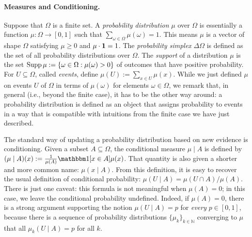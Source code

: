 \paragraph{Measures and Conditioning.}
Suppose that $\Omega$ is a finite set. 
A \emph{probability distribution} $\mu$ over $\Omega$ is essentially a function 
$\mu : \Omega \to [0,1]$ such that $\sum_{\omega \in \Omega} \mu(\omega) = 1$.
This means $\mu$ is a vector of shape 
$\Omega$ 
satisfying $\mu \ge 0$ and $\mu \cdot \mathbf 1 = 1$. 
The \emph{probability simplex} $\Delta \Omega$ is defined as the set of all probability distributions over $\Omega$. 
The \emph{support} of a distribution $\mu$
    is the set $\operatorname{\mathrm{Supp}} \mu := \{ \omega \in \Omega : \mu(\omega) > 0 \}$
    of outcomes that have positive probability.
For $U \subseteq \Omega$, called \emph{events},
    define $\mu(U) := \sum_{x \in U} \mu(x)$. 
While we just defined $\mu$ on events $U$ of $\Omega$ in terms of $\mu(\omega)$ for elements $\omega \in \Omega$, we remark that, in general (i.e., beyond the finite case), it has to be the other way around: 
a probability distribution is defined as an object that assigns probability to events in a way that is compatible with intuitions from the finite case we have just described.


The standard way of updating a probability distribution based on new evidence is conditioning.
Given a subset $A \subseteq \Omega$, the conditional measure
$\mu \mid A$ is defined by
$(\mu \mid A)(x) := \frac{1}{\mu(A)} \mathbbm 1[x \in A] \mu(x)$.
That quantity is also given a shorter and more common name: $\mu(x \mid A)$. 
From this definition, it is easy to recover the usual definition of conditional probability:
$\mu(U \mid A) = \mu(U \cap A) / \mu(A)$. 
There is just one caveat: this formula is not meaningful when $\mu(A) = 0$; in this case, we leave the conditional probability undefined.
Indeed, if $\mu(A) = 0$, there is a strong argument supporting the notion $\mu(U \mid A) = p$ for \emph{every} $p\in[0,1]$, because there is a sequence of probability distributions $\{ \mu_k \}_{k \in \mathbb N}$ converging to $\mu$ that all $\mu_k(U \mid A) = p$ for all $k$. 


